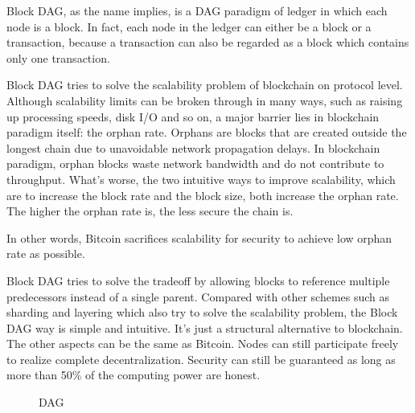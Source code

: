 \documentclass[a4paper,11pt]{article}
\begin{document}
Block DAG, as the name implies, is a DAG paradigm of ledger in which each node
is a block. In fact, each node in the ledger can either be a block or a
transaction, because a transaction can also be regarded as a block which
contains only one transaction.

Block DAG tries to solve the scalability problem of blockchain on protocol
level. Although scalability limits can be broken through in many ways, such as
raising up processing speeds, disk I/O and so on, a major barrier lies in
blockchain paradigm itself: the orphan rate. Orphans are blocks that are created
outside the longest chain due to unavoidable network propagation delays. In
blockchain paradigm, orphan blocks waste network bandwidth and do not contribute
to throughput. What's worse, the two intuitive ways to improve scalability, which
are to increase the block rate and the block size, both increase the orphan
rate. The higher the orphan rate is, the less secure the chain
is\cite{Yonatan-high-rate-bitcoin}\cite{bitcoin-backbone}\cite{asynchronous}.

In other words, Bitcoin sacrifices scalability for security to achieve low
orphan rate as possible.

Block DAG tries to solve the tradeoff by allowing blocks to reference multiple
predecessors instead of a single parent. Compared with other schemes such as
sharding and layering which also try to solve the scalability problem, the Block
DAG way is simple and intuitive. It's just a structural alternative to
blockchain. The other aspects can be the same as Bitcoin. Nodes can still
participate freely to realize complete decentralization.  Security can still be
guaranteed as long as more than 50\% of the computing power are honest.

\begin{figure}[hbt]
	\centerline{%
	}
\caption{DAG}
\end{figure}
\end{document}
